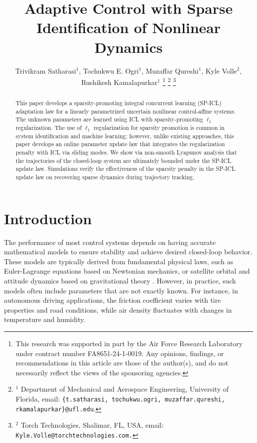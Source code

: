 \documentclass[conference]{ieeeconf}
\begin{document}
\title{\LARGE \bf Adaptive Control with Sparse Identification of Nonlinear Dynamics}
\author{Trivikram Satharasi$^{1}$, Tochukwu E. Ogri$^{1}$, Muzaffar Qureshi$^{1}$, Kyle Volle$^{2}$, Rushikesh Kamalapurkar$^{1}$
\thanks{This research was supported in part by the Air Force Research Laboratory under contract number FA8651-24-1-0019. Any opinions, findings, or recommendations in this article are those of the author(s), and do not necessarily reflect the views of the sponsoring agencies.}%
\thanks{$^{1}$ Department of Mechanical and Aerospace Engineering, University of Florida, email: {\tt\footnotesize \{t.satharasi, tochukwu.ogri, muzaffar.qureshi, rkamalapurkar\}@ufl.edu}.}%
\thanks{$^{2}$ Torch Technologies, Shalimar, FL, USA, email: {\tt \footnotesize Kyle.Volle@torchtechnologies.com.}}}
\maketitle
\thispagestyle{empty}
\pagestyle{empty}

\begin{abstract}
This paper develops a sparsity-promoting integral concurrent learning (SP-ICL) adaptation law for a linearly parametrized uncertain nonlinear control-affine systems. The unknown parameters are learned using ICL with sparsity-promoting $\ell_1$ regularization. The use of $\ell_1$ regularization for sparsity promotion is common in system identification and machine learning; however, unlike existing approaches, this paper develops an online parameter update law that integrates the regularization penalty with ICL via sliding modes. We show via non-smooth Lyapunov analysis that the trajectories of the closed-loop system are ultimately bounded under the SP-ICL update law. Simulations verify the effectiveness of the sparsity penalty in the SP-ICL update law on recovering sparse dynamics during trajectory tracking. 
\end{abstract}

\section{Introduction}

The performance of most control systems depends on having accurate mathematical models to ensure stability and achieve desired closed-loop behavior. These models are typically derived from fundamental physical laws, such as Euler-Lagrange equations based on Newtonian mechanics, or satellite orbital and attitude dynamics based on gravitational theory \cite{Brunton2016}. However, in practice, such models often include parameters that are not exactly known. For instance, in autonomous driving applications, the friction coefficient varies with tire properties and road conditions, while air density fluctuates with changes in temperature and humidity.
\end{document}
